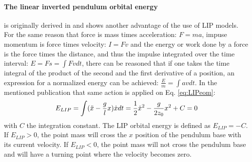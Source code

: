 \paragraph{The linear inverted pendulum orbital energy}\label{subsec:liporbit} is originally derived in \cite{kajita1992dynamic} and shows another advantage of the use of \ac{LIP} models. For the same reason that force is mass times acceleration: $F=ma$, impuse momentum is force times velocity: $I=Fv$ and the energy or work done by a force is the force times the distance, and thus the impulse integrated over the time interval: $E = Fs = \int Fv dt$, there can be reasoned that if one takes the time integral of the product of the second and the first derivative of a position, an expression for a normalized energy can be achieved: $\frac{E}{m}=\int av dt$. In the mentioned publication that same action is applied on Eq. \eqref{eq:LIPeom}:
\begin{equation}
E_{LIP} = \int (\ddot{x}-\frac{g}{l}x)\dot{x} dt = \frac{1}{2}\dot{x}^2-\frac{g}{2z_0}x^2 +C=0
\label{eq:Elip}
\end{equation}
with $C$ the integration constant. The \ac{LIP} orbital energy is defined as $E_{LIP}=-C$. If $E_{LIP}>0$, the point mass will cross the $x$ position of the pendulum base with its current velocity. If $E_{LIP}<0$, the point mass will not cross the pendulum base and will have a turning point where the velocity becomes zero.

